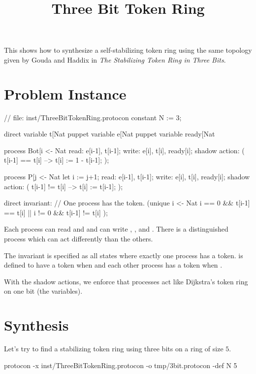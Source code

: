 
\title{Three Bit Token Ring}
\date{}



This shows how to synthesize a self-stabilizing token ring using the same topology given by 
Gouda and Haddix in \textit{The Stabilizing Token Ring in Three Bits}.

\section{Problem Instance}

\begin{code}
// file: inst/ThreeBitTokenRing.protocon
constant N := 3;

direct variable t[Nat %
puppet variable e[Nat %
puppet variable ready[Nat %

process Bot[i <- Nat %
{
  read:  e[i-1], t[i-1];
  write: e[i], t[i], ready[i];
  shadow action: ( t[i-1] == t[i] --> t[i] := 1 - t[i-1]; );
}

process P[j <- Nat %
{
  let i := j+1;
  read:  e[i-1], t[i-1];
  write: e[i], t[i], ready[i];
  shadow action: ( t[i-1] != t[i] --> t[i] := t[i-1]; );
}

direct invariant:
  // One process has the token.
  (unique i <- Nat %
   i == 0 && t[i-1] == t[i]
   ||
   i != 0 && t[i-1] != t[i]
  );
\end{code}

Each process can read  and  and can write , , and .
There is a distinguished process  which can act differently than the others.

The invariant is specified as all states where exactly one process has a token.
 is defined to have a token when  and each other  process has a token when .

With the shadow actions, we enforce that processes act like Dijkstra's token ring on one bit (the  variables).

\section{Synthesis}

Let's try to find a stabilizing token ring using three bits on a ring of size $5$.
\begin{code}
protocon -x inst/ThreeBitTokenRing.protocon -o tmp/3bit.protocon -def N 5
\end{code}

